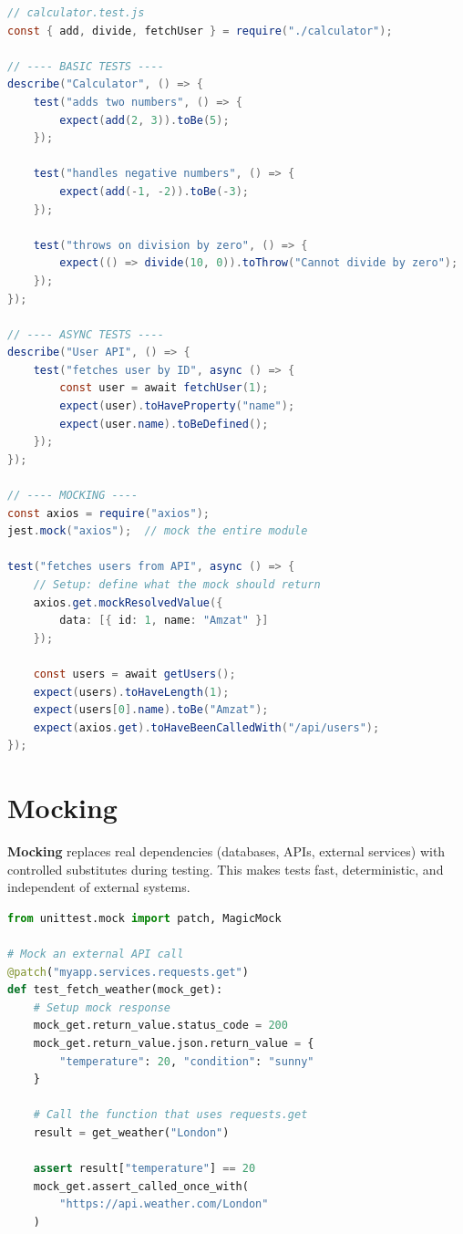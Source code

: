 \documentclass[12pt, a4paper, oneside]{book}
\begin{document}
\begin{lstlisting}[language=Java, caption={Jest testing for Node.js}]
// calculator.test.js
const { add, divide, fetchUser } = require("./calculator");

// ---- BASIC TESTS ----
describe("Calculator", () => {
    test("adds two numbers", () => {
        expect(add(2, 3)).toBe(5);
    });

    test("handles negative numbers", () => {
        expect(add(-1, -2)).toBe(-3);
    });

    test("throws on division by zero", () => {
        expect(() => divide(10, 0)).toThrow("Cannot divide by zero");
    });
});

// ---- ASYNC TESTS ----
describe("User API", () => {
    test("fetches user by ID", async () => {
        const user = await fetchUser(1);
        expect(user).toHaveProperty("name");
        expect(user.name).toBeDefined();
    });
});

// ---- MOCKING ----
const axios = require("axios");
jest.mock("axios");  // mock the entire module

test("fetches users from API", async () => {
    // Setup: define what the mock should return
    axios.get.mockResolvedValue({
        data: [{ id: 1, name: "Amzat" }]
    });

    const users = await getUsers();
    expect(users).toHaveLength(1);
    expect(users[0].name).toBe("Amzat");
    expect(axios.get).toHaveBeenCalledWith("/api/users");
});
\end{lstlisting}

\section{Mocking}

\textbf{Mocking} replaces real dependencies (databases, APIs, external services) with controlled substitutes during testing. This makes tests fast, deterministic, and independent of external systems.

\begin{lstlisting}[language=Python, caption={Mocking in Python}]
from unittest.mock import patch, MagicMock

# Mock an external API call
@patch("myapp.services.requests.get")
def test_fetch_weather(mock_get):
    # Setup mock response
    mock_get.return_value.status_code = 200
    mock_get.return_value.json.return_value = {
        "temperature": 20, "condition": "sunny"
    }

    # Call the function that uses requests.get
    result = get_weather("London")

    assert result["temperature"] == 20
    mock_get.assert_called_once_with(
        "https://api.weather.com/London"
    )
\end{lstlisting}
\end{document}
